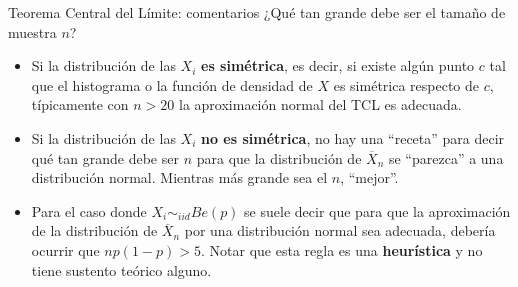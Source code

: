 \documentclass{beamer}
\theoremstyle{definition}
\begin{document}



\begin{frame}{\color{rosee}Teorema Central del L\'imite: comentarios}\small
{\color{rosee}¿Qu\'e tan grande debe ser el tamaño de muestra $n$?}
    \begin{itemize}
    \item Si la distribuci\'on de las $X_i$ \textbf{es sim\'etrica}, es decir, si existe
      alg\'un punto $c$ tal que el histograma o la funci\'on de densidad de
      $X$ es sim\'etrica respecto de $c$, t\'ipicamente con $n>20$ la
      aproximaci\'on normal del TCL es adecuada.
    \item Si la distribuci\'on de las $X_i$ \textbf{no es sim\'etrica}, no hay una
      ``receta'' para decir qué tan grande debe ser $n$ para que la distribución de $\overline{X}_n$ se ``parezca'' a una distribución normal. Mientras m\'as grande sea el $n$, ``mejor''.
      \item Para el caso donde $X_i\sim_{iid} Be(p)$ se suele decir que para que la aproximación de la distribución de $\overline{X}_n$ por una distribución normal sea adecuada, debería ocurrir que $np(1-p)>5.$ Notar que esta regla es una \textbf{heurística} y no tiene sustento teórico alguno.
    \end{itemize}

\end{frame}
\end{document}
